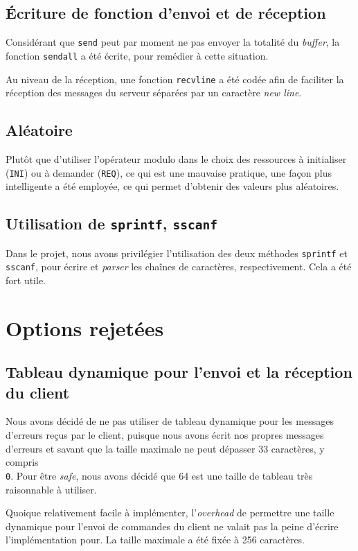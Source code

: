 \documentclass[12pt, letterpaper]{article}
\begin{document}
\subsection*{Écriture de fonction d'envoi et de réception}
Considérant que \texttt{send} peut par moment ne pas envoyer la totalité du
\textit{buffer}, la fonction \texttt{sendall} a été écrite, pour remédier à
cette situation.

Au niveau de la réception, une fonction \texttt{recvline} a été codée afin de
faciliter la réception des messages du serveur séparées par un caractère
\textit{new line}.
\subsection*{Aléatoire}
Plutôt que d'utiliser l'opérateur modulo dans le choix des ressources à
initialiser (\texttt{INI}) ou à demander (\texttt{REQ}), ce qui est une
mauvaise pratique, une façon plus intelligente a été employée, ce qui permet
d'obtenir des valeurs plus aléatoires.
\subsection*{Utilisation de \texttt{sprintf}, \texttt{sscanf}}
Dans le projet, nous avons privilégier l'utilisation des deux méthodes
\texttt{sprintf} et \texttt{sscanf}, pour écrire et \textit{parser} les chaînes
de caractères, respectivement. Cela a été fort utile.

\section*{Options rejetées}
\subsection*{Tableau dynamique pour l'envoi et la réception du client}
Nous avons décidé de ne pas utiliser de tableau dynamique pour les messages
d'erreurs reçus par le client, puisque nous avons écrit nos propres messages
d'erreurs et savant que la taille maximale ne peut dépasser 33 caractères, y
compris \texttt{\\0}. Pour être \textit{safe}, nous avons décidé que 64 est une
taille de tableau très raisonnable à utiliser.

Quoique relativement facile à implémenter, l'\textit{overhead} de permettre une
taille dynamique pour l'envoi de commandes du client ne valait pas la peine
d'écrire l'implémentation pour. La taille maximale a été fixée à 256 caractères.
\end{document}
